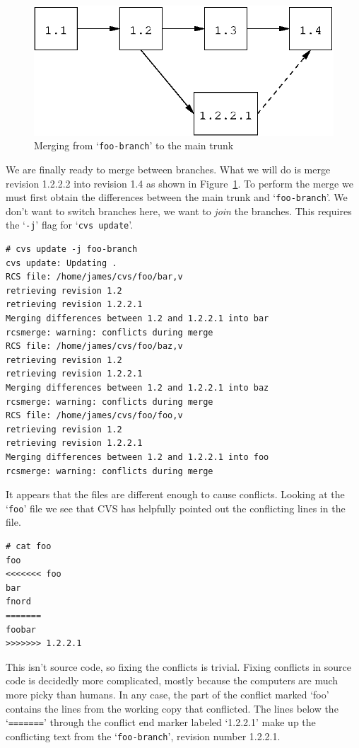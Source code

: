\documentclass[12pt,letterpaper]{article}
\newcommand{\cmd}[1]{`\texttt{#1}'}
\begin{document}
\begin{figure}[htb]
\begin{center}
\includegraphics{walkthru-bmerge.eps}
\end{center}
\caption{Merging from \cmd{foo-branch} to the main trunk}
\label{fig:walkthru-bmerge}
\end{figure}

We are finally ready to merge between branches.  What we will do is merge
revision 1.2.2.2 into revision 1.4 as shown in
Figure~\ref{fig:walkthru-bmerge}.  To perform the merge we must first obtain
the differences between the main trunk and \cmd{foo-branch}.  We don't want to
switch branches here, we want to \emph{join} the branches.  This requires the
\cmd{-j} flag for \cmd{cvs update}.

\begin{Verbatim}
# cvs update -j foo-branch
cvs update: Updating .
RCS file: /home/james/cvs/foo/bar,v
retrieving revision 1.2
retrieving revision 1.2.2.1
Merging differences between 1.2 and 1.2.2.1 into bar
rcsmerge: warning: conflicts during merge
RCS file: /home/james/cvs/foo/baz,v
retrieving revision 1.2
retrieving revision 1.2.2.1
Merging differences between 1.2 and 1.2.2.1 into baz
rcsmerge: warning: conflicts during merge
RCS file: /home/james/cvs/foo/foo,v
retrieving revision 1.2
retrieving revision 1.2.2.1
Merging differences between 1.2 and 1.2.2.1 into foo
rcsmerge: warning: conflicts during merge
\end{Verbatim}

It appears that the files are different enough to cause conflicts.  Looking at
the \cmd{foo} file we see that CVS has helpfully pointed out the conflicting
lines in the file.

\begin{Verbatim}
# cat foo
foo
<<<<<<< foo
bar
fnord
=======
foobar
>>>>>>> 1.2.2.1
\end{Verbatim}

This isn't source code, so fixing the conflicts is trivial.  Fixing conflicts
in source code is decidedly more complicated, mostly because the computers are
much more picky than humans.  In any case, the part of the conflict marked
`foo' contains the lines from the working copy that conflicted.  The lines
below the \cmd{=======} through the conflict end marker labeled `1.2.2.1' make
up the conflicting text from the \cmd{foo-branch}, revision number 1.2.2.1.
\end{document}
